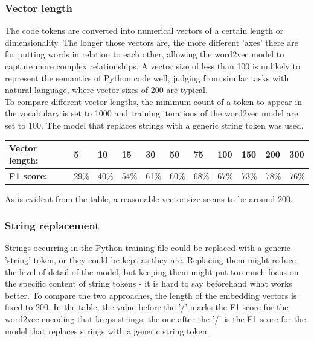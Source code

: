 \documentclass[
	a4paper,
	pagesize,
	pdftex,
	12pt,
	twoside, %
	BCOR=5mm, %
	ngerman,
	fleqn,
	final,
	]{scrartcl}
\begin{document}
\subsubsection{Vector length}
The code tokens are converted into numerical vectors of a certain length or dimensionality. The longer those vectors are, the more different 'axes' there are for putting words in relation to each other, allowing the word2vec model to capture more complex relationships. A vector size of less than 100 is unlikely to represent the semantics of Python code well, judging from similar tasks with natural language, where vector sizes of 200 are typical.\\
To compare different vector lengths, the minimum count of a token to appear in the vocabulary is set to 1000 and training iterations of the word2vec model are set to 100. The model that replaces strings with a generic string token was used.



\begin{tabular}{| p{3.5cm}  | p{0.6cm} | p{0.6cm} | p{0.6cm} | p{0.6cm} | p{0.6cm} | p{0.6cm} | p{0.8cm} | p{0.8cm} | p{0.8cm} | p{0.8cm} | }
	\hline
	\textbf{Vector length:} & 5 & 10 & 15 & 30 & 50 & 75 & 100 & 150 & 200 & 300 \\
	\hline
	
	\textbf{F1 score:} & 29\% & 40\% & 54\% & 61\% & 60\% & 68\% & 67\% & 73\% & 78\% & 76\% \\
	\hline
	\hline
\end{tabular}

As is evident from the table, a reasonable vector size seems to be around 200. 


\subsubsection{String replacement}

Strings occurring in the Python training file could be replaced with a generic 'string' token, or they could be kept as they are. Replacing them might reduce the level of detail of the model, but keeping them might put too much focus on the specific content of string tokens - it is hard to say beforehand what works better. To compare the two approaches, the length of the embedding vectors is fixed to 200. In the table, the value before the '/' marks the F1 score for the word2vec encoding that keeps strings, the one after the '/' is the F1 score for the model that replaces strings with a generic string token. 
\end{document}
